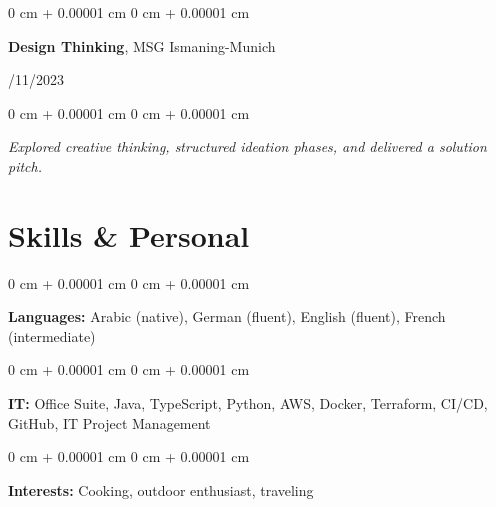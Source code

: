 \documentclass[10pt, letterpaper]{article}
\newenvironment{onecolentry}{
    \begin{adjustwidth}{
        0 cm + 0.00001 cm
    }{
        0 cm + 0.00001 cm
    }
}{
    \end{adjustwidth}
} %
\newenvironment{twocolentry}[2][]{
    \onecolentry
    \def\secondColumn{#2}
    \setcolumnwidth{\fill, 4.5 cm}
    \begin{paracol}{2}
}{
    \switchcolumn \raggedleft \secondColumn
    \end{paracol}
    \endonecolentry
} %
\begin{document}
\vspace{0.2cm}
\begin{twocolentry}{03/11/2023}
\textbf{Design Thinking}, MSG Ismaning-Munich
\end{twocolentry}
\begin{onecolentry}
\textit{Explored creative thinking, structured ideation phases, and delivered a solution pitch.}
\end{onecolentry}    
 \section{Skills \& Personal}

\begin{onecolentry}
\textbf{Languages:} Arabic (native), German (fluent), English (fluent), French (intermediate)
\end{onecolentry}
\vspace{0.1cm}
\begin{onecolentry}
\textbf{IT:} Office Suite, Java, TypeScript, Python, AWS, Docker, Terraform, CI/CD, GitHub, IT Project Management
\end{onecolentry}
\vspace{0.1cm}
\begin{onecolentry}
\textbf{Interests:} Cooking, outdoor enthusiast, traveling
\end{onecolentry}


    
\end{document}
